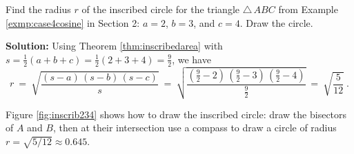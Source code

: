 \begin{exmp}
 Find the radius $r$ of the inscribed circle for the triangle $\triangle\,ABC$ from Example
 \ref{exmp:case4cosine} in Section 2: $a = 2$, $b = 3$, and $c = 4$. Draw the circle.

\piccaption[]{\label{fig:inscrib234}}
 \par\noindent\textbf{Solution:} Using Theorem \ref{thm:inscribedarea} with\\$s = \frac{1}{2}(a+b+c) =
 \frac{1}{2}(2+3+4) = \frac{9}{2}$, we have
 \begin{displaymath}
  r ~=~ \sqrt{\frac{(s-a)\,(s-b)\,(s-c)}{s}} ~=~
   \sqrt{\frac{\left(\frac{9}{2}-2\right)\,\left(\frac{9}{2}-3\right)\,\left(\frac{9}{2}-
   4\right)}{\frac{9}{2}}} ~=~ \sqrt{\frac{5}{12}}~.
 \end{displaymath}
 \par\noindent Figure \ref{fig:inscrib234} shows how to draw the inscribed circle: draw the
 bisectors of $A$ and $B$, then at their intersection use a compass to draw a circle of radius
 $r = \sqrt{5/12} \approx 0.645$.
\end{exmp}\vspace{-2mm}
\divider
\vspace{2mm}

